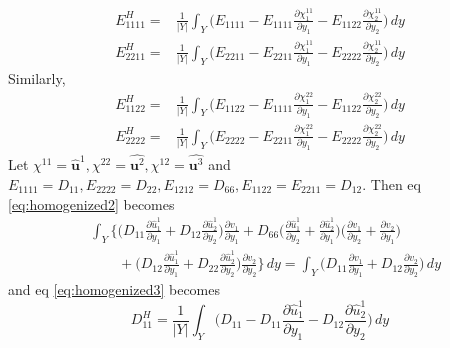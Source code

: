 \documentclass[openright,twoside]{iitkthesis}
\newcommand{\e}[1]{\textbf{#1}}
\begin{document}
\begin{eqnarray}
\label{eq:homogenized3}
E^H_{1111} = &\frac{1}{|Y|}\int_Y\bigg ( E_{1111} - E_{1111}\frac{\partial \chi^{11}_1}{\partial y_1} - E_{1122}\frac{\partial \chi^{11}_2}{\partial y_2}\bigg )\,dy\\
E^H_{2211} = &\frac{1}{|Y|}\int_Y\bigg ( E_{2211} - E_{2211}\frac{\partial \chi^{11}_1}{\partial y_1} - E_{2222}\frac{\partial \chi^{11}_2}{\partial y_2}\bigg )\,dy
\end{eqnarray}
Similarly,
\begin{eqnarray}
\label{eq:homogenized4}
E^H_{1122} = &\frac{1}{|Y|}\int_Y\bigg ( E_{1122} - E_{1111}\frac{\partial \chi^{22}_1}{\partial y_1} - E_{1122}\frac{\partial \chi^{22}_2}{\partial y_2}\bigg )\,dy\\
E^H_{2222} = &\frac{1}{|Y|}\int_Y\bigg ( E_{2222} - E_{2211}\frac{\partial \chi^{22}_1}{\partial y_1} - E_{2222}\frac{\partial \chi^{22}_2}{\partial y_2}\bigg )\,dy
\end{eqnarray}
Let $\chi^{11} = \hat{\e u}^1, \chi^{22} = \hat{\e u^2}, \chi^{12} = \hat{\e u^3}$ and $E_{1111} = D_{11}, E_{2222} = D_{22}, E_{1212} = D_{66}, E_{1122} = E_{2211} = D_{12}$. Then eq \eqref{eq:homogenized2} becomes
\begin{equation}
\label{eq:dehomogenized}
\begin{split}
&\int_Y \bigg \{\bigg ( D_{11}\frac{\partial \hat u^1_1}{\partial y_1} + D_{12}\frac{\partial \hat u^1_2}{\partial y_2}\bigg )\frac{\partial v_1}{\partial y_1}
+ D_{66}\bigg (\frac{\partial \hat u^1_1}{\partial y_2} + \frac{\partial \hat u^1_2}{\partial y_1}\bigg )\bigg (\frac{\partial v_1}{\partial y_2} +\frac{\partial v_2}{\partial y_1}\bigg )\\
&\qquad + \bigg (D_{12}\frac{\partial \hat u^1_1}{\partial y_1} + D_{22}\frac{\partial \hat u^1_2}{\partial y_2}\bigg )\frac{\partial v_2}{\partial y_2}\bigg \}\,dy = \int_Y\bigg (D_{11}\frac{\partial v_1}{\partial y_1}+D_{12}\frac{\partial v_2}{\partial y_2}\bigg )\, dy
\end{split}
\end{equation}
and eq \eqref{eq:homogenized3} becomes
\begin{equation}
\label{Dhomo}
D^H_{11} = \frac{1}{|Y|}\int_Y\bigg (D_{11}-D_{11}\frac{\partial\hat u^1_1}{\partial y_1} - D_{12}\frac{\partial \hat u^1_2}{\partial y_2}\bigg )\,dy
\end{equation}
\end{document}
